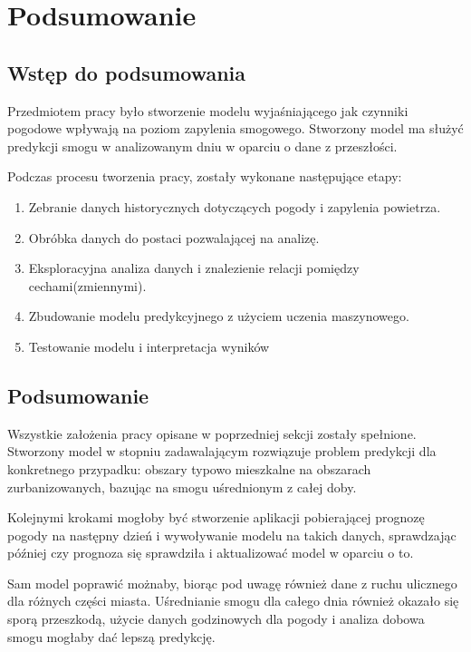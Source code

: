 \documentclass[a4paper,12pt,twoside,openany]{report}
\begin{document}
\chapter{Podsumowanie}

\section{Wstęp do podsumowania}

Przedmiotem pracy było stworzenie modelu wyjaśniającego jak czynniki pogodowe wpływają na poziom zapylenia smogowego. Stworzony model ma służyć predykcji smogu w analizowanym dniu w oparciu o dane z przeszłości.

Podczas procesu tworzenia pracy, zostały wykonane następujące etapy:

\begin{enumerate}
	\item Zebranie danych historycznych dotyczących pogody i zapylenia powietrza.
	\item Obróbka danych do postaci pozwalającej na analizę.
	\item Eksploracyjna analiza danych i znalezienie relacji pomiędzy cechami(zmiennymi).
	\item Zbudowanie modelu predykcyjnego z użyciem uczenia maszynowego.	
	\item Testowanie modelu i interpretacja wyników	
\end{enumerate}

\section{Podsumowanie}

Wszystkie założenia pracy opisane w poprzedniej sekcji zostały spełnione. Stworzony model w stopniu zadawalającym rozwiązuje problem predykcji dla konkretnego przypadku: obszary typowo mieszkalne na obszarach zurbanizowanych, bazując na smogu uśrednionym z całej doby.

Kolejnymi krokami mogłoby być stworzenie aplikacji pobierającej prognozę pogody na następny dzień i wywoływanie modelu na takich danych, sprawdzając później czy prognoza się sprawdziła i aktualizować model w oparciu o to.

Sam model poprawić możnaby, biorąc pod uwagę również dane z ruchu ulicznego dla różnych części miasta. Uśrednianie smogu dla całego dnia również okazało się sporą przeszkodą, użycie danych godzinowych dla pogody i analiza dobowa smogu mogłaby dać lepszą predykcję.
\end{document}
